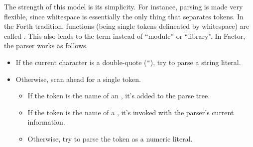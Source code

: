 The strength of this model is its simplicity.  For instance, parsing is made
very flexible, since whitespace is essentially the only thing that separates
tokens.  In the Forth tradition, functions (being single tokens delineated by
whitespace) are called .  This also lends to the term
 instead of ``module'' or ``library''.  In Factor, the parser
works as follows.
\begin{itemize}
  \item If the current character is a double-quote (\lstinline|"|), try to
        parse a string literal.
  \item Otherwise, scan ahead for a single token.
        \begin{itemize}
          \item If the token is the name of an , it's added
                to the parse tree.
          \item If the token is the name of a , it's invoked
                with the parser's current information.
          \item Otherwise, try to parse the token as a numeric literal.
        \end{itemize}
\end{itemize}

